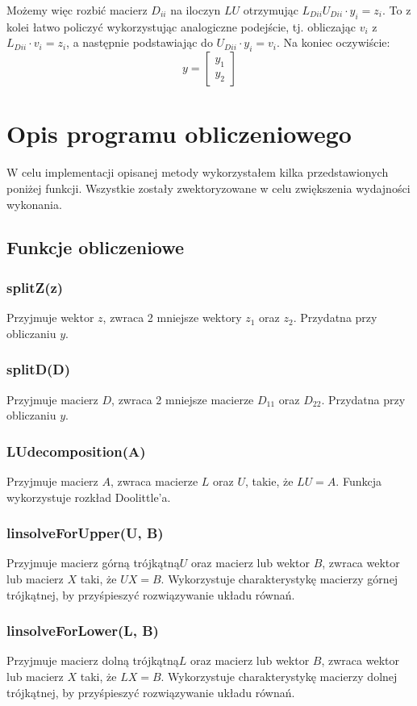 \documentclass{article}
\begin{document}
Możemy więc rozbić macierz \(D_{ii}\) na iloczyn \(LU\) otrzymując \(L_{Dii} U_{Dii} \cdot y_i = z_i\). To z kolei łatwo policzyć wykorzystując analogiczne podejście, tj. obliczając \(v_i\) z \(L_{Dii} \cdot v_i = z_i\), a następnie podstawiając do \(U_{Dii} \cdot y_i = v_i\). Na koniec oczywiście:
\[
    y = 
    \begin{bmatrix}
        y_1 \\
        y_2
    \end{bmatrix}
\]
\vspace{10pt}
\section{Opis programu obliczeniowego}
W celu implementacji opisanej metody wykorzystałem kilka przedstawionych poniżej funkcji.
Wszystkie zostały zwektoryzowane w celu zwiększenia wydajności wykonania.
    \subsection*{Funkcje obliczeniowe}
        \subsubsection*{splitZ(z)}
        Przyjmuje wektor \(z\), zwraca 2 mniejsze wektory \(z_1\) oraz \(z_2\). Przydatna przy obliczaniu \(y\).
        \subsubsection*{splitD(D)}
        Przyjmuje macierz \(D\), zwraca 2 mniejsze macierze \(D_{11}\) oraz \(D_{22}\). Przydatna przy obliczaniu \(y\).
        \subsubsection*{LUdecomposition(A)}
        Przyjmuje macierz \(A\), zwraca macierze \(L\) oraz \(U\), takie, że \(LU = A\). Funkcja wykorzystuje rozkład Doolittle'a.
        \subsubsection*{linsolveForUpper(U, B)}
        Przyjmuje macierz górną trójkątną\(U\) oraz macierz lub wektor \(B\), zwraca wektor lub macierz \(X\) taki, że \(UX = B\). Wykorzystuje charakterystykę macierzy górnej trójkątnej, by przyśpieszyć rozwiązywanie układu równań.
        \subsubsection*{linsolveForLower(L, B)}
        Przyjmuje macierz dolną trójkątną\(L\) oraz macierz lub wektor \(B\), zwraca wektor lub macierz \(X\) taki, że \(LX = B\). Wykorzystuje charakterystykę macierzy dolnej trójkątnej, by przyśpieszyć rozwiązywanie układu równań.
\end{document}
